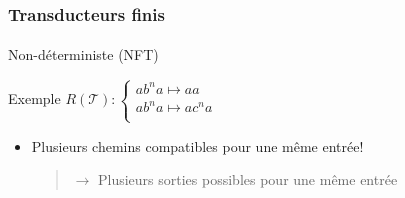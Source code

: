 \frametitle{Transducteurs finis}
\framesubtitle{}

Non-déterministe (NFT)
	
	
\begin{exampleblock}{Exemple}
	$R(\mathscr{T}) : \begin{cases}
	ab^na \mapsto aa \\
	ab^na \mapsto ac^na \\
	\end{cases}$	
\end{exampleblock}


\begin{itemize}
	\item Plusieurs chemins compatibles pour une même entrée!
	
	\begin{quotation}
		$\rightarrow$ Plusieurs sorties possibles pour une même entrée
	\end{quotation}
\end{itemize}